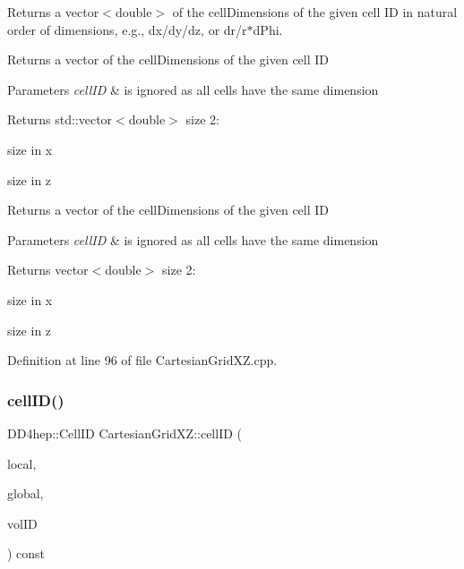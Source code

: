 Returns a vector$<$double$>$ of the cell\+Dimensions of the given cell ID in natural order of dimensions, e.\+g., dx/dy/dz, or dr/r$\ast$d\+Phi. 

Returns a vector of the cell\+Dimensions of the given cell ID 
\begin{DoxyParams}{Parameters}
{\em cell\+ID} & is ignored as all cells have the same dimension \\
\hline
\end{DoxyParams}
\begin{DoxyReturn}{Returns}
std\+::vector$<$double$>$ size 2\+:
\begin{DoxyEnumerate}
\item size in x
\item size in z
\end{DoxyEnumerate}
\end{DoxyReturn}
Returns a vector of the cell\+Dimensions of the given cell ID 
\begin{DoxyParams}{Parameters}
{\em cell\+ID} & is ignored as all cells have the same dimension \\
\hline
\end{DoxyParams}
\begin{DoxyReturn}{Returns}
vector$<$double$>$ size 2\+:
\begin{DoxyEnumerate}
\item size in x
\item size in z 
\end{DoxyEnumerate}
\end{DoxyReturn}


Definition at line 96 of file Cartesian\+Grid\+X\+Z.\+cpp.

\hypertarget{class_d_d4hep_1_1_geometry_1_1_cartesian_grid_x_z_a6b70239098d046763a1ada29146ab1be}{}\label{class_d_d4hep_1_1_geometry_1_1_cartesian_grid_x_z_a6b70239098d046763a1ada29146ab1be} 
\subsubsection{\texorpdfstring{cell\+I\+D()}{cellID()}}
{\footnotesize\ttfamily D\+D4hep\+::\+Cell\+ID Cartesian\+Grid\+X\+Z\+::cell\+ID (\begin{DoxyParamCaption}\item[{const \hyperlink{namespace_d_d4hep_1_1_geometry_a55083902099d03506c6db01b80404900}{Position} \&}]{local,  }\item[{const \hyperlink{namespace_d_d4hep_1_1_geometry_a55083902099d03506c6db01b80404900}{Position} \&}]{global,  }\item[{const Volume\+ID \&}]{vol\+ID }\end{DoxyParamCaption}) const}



